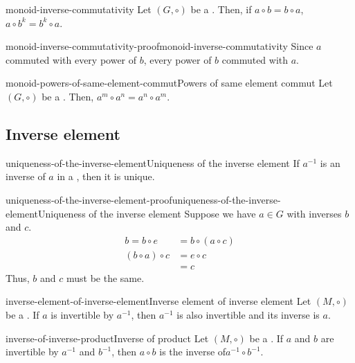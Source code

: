 \documentclass[preview]{standalone}
\begin{document}
\begin{snippetproposition}{monoid-inverse-commutativity}{}
    Let \((G, \circ)\) be a \monoid.
    Then, if \(a\circ b = b\circ a\), \(a\circ b^k = b^k \circ a\).
\end{snippetproposition}

\begin{snippetproof}{monoid-inverse-commutativity-proof}{monoid-inverse-commutativity}{}
    \todo
    Since \(a\) commuted with every power of \(b\), every power of \(b\)
    commuted with \(a\).
\end{snippetproof}

\begin{snippetcorollary}{monoid-powers-of-same-element-commut}{Powers of same element commut}
    Let \((G, \circ)\) be a \monoid.
    Then, \(a^m \circ a^n = a^n \circ a^m\).
\end{snippetcorollary}

\subsection{Inverse element}

\begin{snippettheorem}{uniqueness-of-the-inverse-element}{Uniqueness of the inverse element}
    If \(a^{-1}\) is an inverse of \(a\) in a \monoid, then it is unique.
\end{snippettheorem}

\begin{snippetproof}{uniqueness-of-the-inverse-element-proof}{uniqueness-of-the-inverse-element}{Uniqueness of the inverse element}
    Suppose we have \(a\in G\) with inverses \(b\) and \(c\).
    \begin{align*}
        b = b \circ e &= b \circ (a \circ c) \\
        (b \circ a) \circ c &= e \circ c \\
        &= c
    \end{align*}
    Thus, \(b\) and \(c\) must be the same.
\end{snippetproof}

\begin{snippetproposition}{inverse-element-of-inverse-element}{Inverse element of inverse element}
    Let \((M, \circ)\) be a \monoid. If \(a\) is invertible by \(a^{-1}\),
    then \(a^{-1}\) is also invertible and its inverse is \(a\).
\end{snippetproposition}

\begin{snippetproposition}{inverse-of-inverse-product}{Inverse of product}
    Let \((M, \circ)\) be a \monoid. If \(a\) and \(b\) are invertible by \(a^{-1}\) and \(b^{-1}\),
    then \(a\circ b\) is the inverse of\(a^{-1} \circ b^{-1}\).
\end{snippetproposition}
\end{document}
